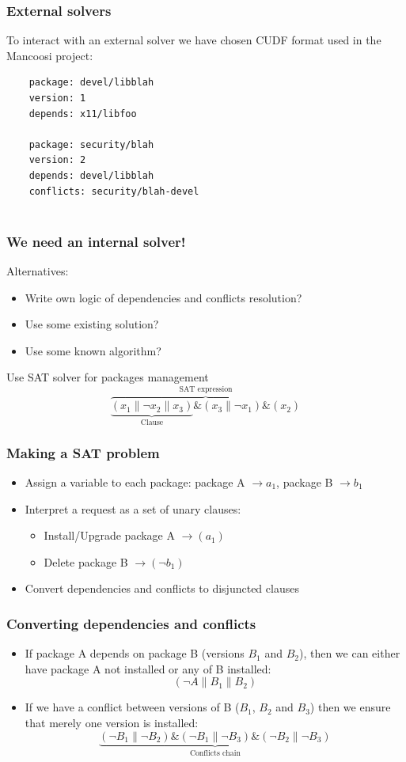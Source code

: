 \documentclass{beamer}
\begin{document}
\begin{frame}[fragile]
\frametitle{External solvers}
To interact with an external solver we have chosen CUDF format used in the
Mancoosi project:
\bigskip
{\small
	\begin{verbatim}
	package: devel/libblah
	version: 1
	depends: x11/libfoo

	package: security/blah
	version: 2
	depends: devel/libblah
	conflicts: security/blah-devel
	
	\end{verbatim}
}
\end{frame}

\begin{frame}
\frametitle{We need an internal solver!}

Alternatives:
\begin{itemize}
  \item Write own logic of dependencies and conflicts resolution?
  \pause
  \item Use some existing solution?
  \pause
  \item Use some known algorithm?
  \pause
\end{itemize}
\bigskip
{\large Use SAT solver for packages management}
\bigskip
\[
\overbrace{\underbrace{(x_1 \| \neg x_2 \|
x_3)}_{\text{Clause}} \& (x_3 \| \neg x_1) \& (x_2)}^{\text{SAT expression}}
\]
\end{frame}

\begin{frame}
\frametitle{Making a SAT problem}
\begin{itemize}
  \item Assign a variable to each package: 
  package A $\to a_1$, package B $\to b_1$
  \item Interpret a request as a set of unary clauses:
  \begin{itemize}
    \item Install/Upgrade package A $\to (a_1)$
    \item Delete package B $\to (\neg b_1)$
  \end{itemize}
  \item Convert dependencies and conflicts to disjuncted clauses
\end{itemize}

\end{frame}

\begin{frame}
\frametitle{Converting dependencies and conflicts}
\begin{itemize}
  \item If package A depends on package B (versions $B_1$ and $B_2$), then we
  can either have package A not installed or any of B installed:
  \bigskip
\[
(\neg A \| B_1 \| B_2)
\]
\pause
  \item If we have a conflict between versions of B ($B_1$, $B_2$ and $B_3$)
 then we ensure that merely one version is installed:
  \bigskip
\[
\underbrace{(\neg B_1 \| \neg B_2) \& (\neg B_1 \| \neg B_3) \& (\neg B_2 \|
\neg B_3)}_{\text{Conflicts chain}}
\]
\end{itemize}
\end{frame}
\end{document}
